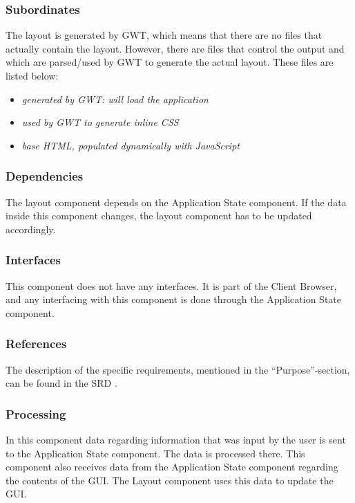 \subsubsection*{Subordinates}
The layout is generated by GWT, which means that there are no files that actually contain the layout. However, there are files that control the output and which are parsed/used by GWT to generate the actual layout. These files are listed below:
\begin{itemize}
	\item {}  \emph{generated by GWT: will load the application}
	\item {}         \emph{used by GWT to generate inline CSS}
	\item {}        \emph{base HTML, populated dynamically with JavaScript}
\end{itemize}

\subsubsection*{Dependencies}
The layout component depends on the Application State component. If the data inside this component changes, the layout component has to be updated accordingly.

\subsubsection*{Interfaces}
This component does not have any interfaces. It is part of the Client Browser, and any interfacing with this component is done through the Application State component.

\subsubsection*{References}
The description of the specific requirements, mentioned in the ``Purpose''-section, can be found in the SRD \cite{srd}.

\subsubsection*{Processing}
In this component data regarding information that was input by the user is sent to the Application State component. The data is processed there. This component also receives data from the Application State component regarding the contents of the GUI. The Layout component uses this data to update the GUI.

